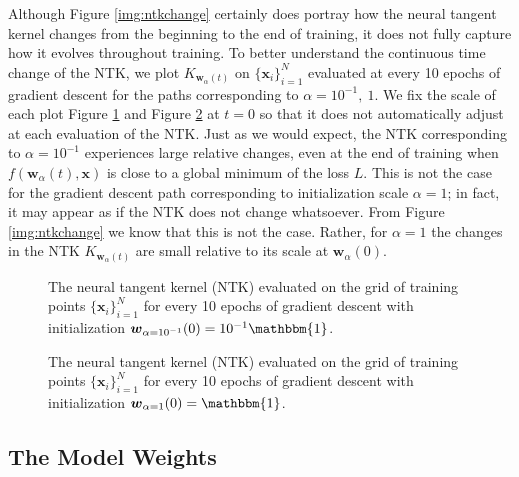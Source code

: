 \documentclass{article}
\begin{document}
Although Figure \ref{img:ntkchange} certainly does portray how the neural tangent kernel changes from the beginning to the end of training, it does not fully capture how it evolves throughout training. To better understand the continuous time change of the NTK, we plot $K_{\boldsymbol{w}_{\alpha}(t)}$ on $\{ \boldsymbol{x}_i \}_{i=1}^N$ evaluated at every 10 epochs of gradient descent for the paths corresponding to $\alpha = 10^{-1}, \ 1$. We fix the scale of each plot Figure \ref{gif:ntk1} and Figure \ref{gif:ntk2} at $t = 0$ so that it does not automatically adjust at each evaluation of the NTK. Just as we would expect, the NTK corresponding to $\alpha = 10^{-1}$ experiences large relative changes, even at the end of training when $f(\boldsymbol{w}_{\alpha}(t), \boldsymbol{x})$ is close to a global minimum of the loss $L$. This is not the case for the gradient descent path corresponding to initialization scale $\alpha = 1$; in fact, it may appear as if the NTK does not change whatsoever. From Figure \ref{img:ntkchange} we know that this is not the case. Rather, for $\alpha = 1$ the changes in the NTK $K_{\boldsymbol{w}_{\alpha}(t)}$ are small relative to its scale at $\boldsymbol{w}_{\alpha}(0)$.

\begin{figure}[H]
\caption{The neural tangent kernel (NTK) evaluated on the grid of training points $\{ \boldsymbol{x}_i \}_{i=1}^N$ for every 10 epochs of gradient descent with initialization $\boldsymbol{w}_{\alpha = 10^{-1}}(0) = 10^{-1}\mathbbm{1}$.}\label{gif:ntk1}
\end{figure}

\newpage

\vspace*{\fill}
\begin{figure}[H]
\caption{The neural tangent kernel (NTK) evaluated on the grid of training points $\{ \boldsymbol{x}_i \}_{i=1}^N$ for every 10 epochs of gradient descent with initialization $\boldsymbol{w}_{\alpha = 1}(0) = \mathbbm{1}$.}\label{gif:ntk2}
\end{figure}
\vspace*{\fill}

\newpage

\subsection{The Model Weights}
\end{document}
